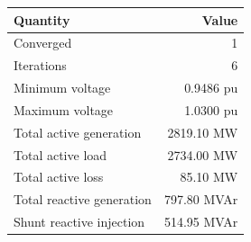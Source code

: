 \begin{tabular}{lr}
\toprule
Quantity & Value\\
\midrule
Converged & 1\\
Iterations & 6\\
Minimum voltage & 0.9486 pu\\
Maximum voltage & 1.0300 pu\\
Total active generation & 2819.10 MW\\
Total active load & 2734.00 MW\\
Total active loss & 85.10 MW\\
Total reactive generation & 797.80 MVAr\\
Shunt reactive injection & 514.95 MVAr\\
\bottomrule
\end{tabular}
